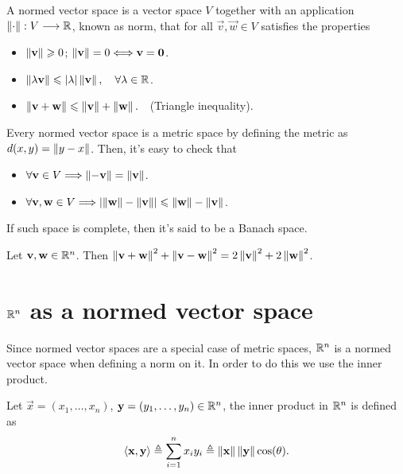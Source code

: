 \begin{defn}\label{def:normed-vector-space}
A normed vector space is a vector space $V$ together with an application $\appl{\vnorm{\cdot}}{V}{\R}$, known as norm, 
that for all $\vec{v}, \vec{w}\in V$ satisfies the properties
\begin{itemize}[itemsep = -2pt]
\item $\left\Vert \mathbf{v} \right\Vert \geqslant 0$; $\left\Vert \mathbf{v} \right\Vert = 0\Longleftrightarrow \mathbf{v} = \mathbf{0}$.
\item $\vnorm{\lambda\vec{v}}\leq\abs{\lambda}\vnorm{\vec{v}},\quad\forall\lambda\in\R$.
\item $\left\Vert \mathbf{v} + \mathbf{w} \right\Vert \leqslant \left\Vert \mathbf{v} \right\Vert + \left\Vert \mathbf{w} \right\Vert.\quad$(Triangle inequality).
\end{itemize}
\end{defn}

\begin{prop}
Every normed vector space is a metric space by defining the metric as $d(x, y) = \left\Vert y - x \right\Vert$. Then, it's easy to check that
\begin{itemize}[itemsep = -2pt]
\item $\forall\mathbf{v}\in V\Longrightarrow \left\Vert -\mathbf{v} \right\Vert = \left\Vert \mathbf{v} \right\Vert$.
\item $\forall\mathbf{v}, \mathbf{w}\in V\Longrightarrow \abs{\left\Vert \mathbf{w} \right\Vert - \left\Vert \mathbf{v} \right\Vert} \leqslant \left\Vert \mathbf{w} \right\Vert - \left\Vert \mathbf{v} \right\Vert$.
\end{itemize}
If such space is complete, then it's said to be a Banach space.
\end{prop}

\begin{prop}
    Let $\vec{v}, \vec{w}\in\Rtn$. Then $\left\Vert \mathbf{v} + \mathbf{w} \right\Vert^2 + \left\Vert \mathbf{v} - \mathbf{w} \right\Vert^2 = 2\left\Vert \mathbf{v} \right\Vert^2 +
    2\left\Vert \mathbf{w} \right\Vert^2$.
\end{prop}

\section{$\Rtn$ as a normed vector space}

Since normed vector spaces are a special case of metric spaces, $\Rtn$ is a normed vector space when defining a norm on it. In 
order to do this we use the inner product. 

\begin{defn}\label{def:inner-product}
Let $\vec{x} = \left(x_1, \ldots, x_n\right)$, $\vec{y} = \left(y_1, \ldots, y_n\right)\in\Rtn$, the inner product in $\Rtn$
is defined as
\begin{equation}\label{eq:inner-product}
\langle \mathbf{x}, \mathbf{y} \rangle \triangleq \sum_{i=1}^n x_i y_i \triangleq\left\Vert \mathbf{x} \right\Vert\left\Vert \mathbf{y} \right\Vert\cos(\theta).
\end{equation}
\end{defn}

